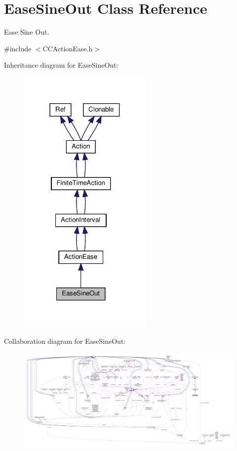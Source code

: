 \hypertarget{classEaseSineOut}{}\section{Ease\+Sine\+Out Class Reference}
\label{classEaseSineOut}


Ease Sine Out.  




{\ttfamily \#include $<$C\+C\+Action\+Ease.\+h$>$}



Inheritance diagram for Ease\+Sine\+Out\+:
\nopagebreak
\begin{figure}[H]
\begin{center}
\leavevmode
\includegraphics[width=186pt]{classEaseSineOut__inherit__graph}
\end{center}
\end{figure}


Collaboration diagram for Ease\+Sine\+Out\+:
\nopagebreak
\begin{figure}[H]
\begin{center}
\leavevmode
\includegraphics[width=350pt]{classEaseSineOut__coll__graph}
\end{center}
\end{figure}
